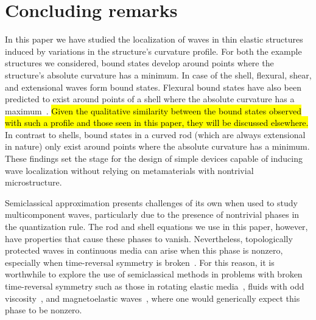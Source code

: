 %

\section{Concluding remarks}
\label{sec:conclusion}

In this paper we have studied the localization of waves in thin elastic structures induced by variations in the structure's curvature profile.
For both the example structures we considered, bound states develop around points where the structure's absolute curvature has a minimum.
In case of the shell, flexural, shear, and extensional waves form bound states.
Flexural bound states have also been predicted to exist around points of a shell where the absolute curvature has a maximum~\cite{mohammed2021}.
\hl{Given the qualitative similarity between the bound states observed with such a profile and those seen in this paper, they will be discussed elsewhere.}
In contrast to shells, bound states in a curved rod (which are always extensional in nature) only exist around points where the absolute curvature has a minimum.
These findings set the stage for the design of simple devices capable of inducing wave localization without relying on metamaterials with nontrivial microstructure.

Semiclassical approximation presents challenges of its own when used to study multicomponent waves, particularly due to the presence of nontrivial phases in the quantization rule.
The rod and shell equations we use in this paper, however, have properties that cause these phases to vanish.
Nevertheless, topologically protected waves in continuous media can arise when this phase is nonzero, especially when time-reversal symmetry is broken~\cite{venaille2023}.
For this reason, it is worthwhile to explore the use of semiclassical methods in problems with broken time-reversal symmetry such as those in rotating elastic media~\cite{marijanovic2022}, fluids with odd viscosity~\cite{souslov2019}, and magnetoelastic waves~\cite{banos1956}, where one would generically expect this phase to be nonzero.


